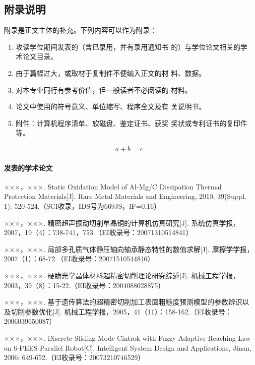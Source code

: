 \begin{appendixenv}
    \chapter{附录说明}
    
    附录是正文主体的补充。下列内容可以作为附录：
    \begin{enumerate}
        \item 攻读学位期间发表的（含已录用，并有录用通知书
        的）与学位论文相关的学术论文目录。
        \item 由于篇幅过大，或取材于复制件不便编入正文的材
        料、数据。
        \item 对本专业同行有参考价值，但一般读者不必阅读的
        材料。
        \item 论文中使用的符号意义、单位缩写、程序全文及有
        关说明书。
        \item 附件：计算机程序清单、软磁盘、鉴定证书、获奖
        奖状或专利证书的复印件等。
    \end{enumerate}
    
    \begin{align}
        a+b=c
    \end{align}
    
    
    \subsubsection{发表的学术论文}
    \begin{publications}
        \item ×××，×××. Static Oxidation Model of Al-Mg/C Dissipation Thermal Protection Materials[J]. Rare Metal Materials and Engineering, 2010, 39(Suppl. 1): 520-524.（SCI收录，IDS号为669JS，IF=0.16）
        \item ×××，×××. 精密超声振动切削单晶铜的计算机仿真研究[J]. 系统仿真学报，2007，19（4）：738-741，753.（EI收录号：20071310514841）
        \item ×××，×××. 局部多孔质气体静压轴向轴承静态特性的数值求解[J]. 摩擦学学报，2007（1）：68-72.（EI收录号：20071510544816）
        \item ×××，×××. 硬脆光学晶体材料超精密切削理论研究综述[J]. 机械工程学报，2003，39（8）：15-22.（EI收录号：2004088028875）
        \item ×××，×××. 基于遗传算法的超精密切削加工表面粗糙度预测模型的参数辨识以及切削参数优化[J]. 机械工程学报，2005，41（11）：158-162.（EI收录号：2006039650087）
        \item ×××，×××. Discrete Sliding Mode Cintrok with Fuzzy Adaptive Reaching Law on 6-PEES Parallel Robot[C]. Intelligent System Design and Applications, Jinan, 2006: 649-652.（EI收录号：20073210746529）
    \end{publications}
    

\end{appendixenv}
